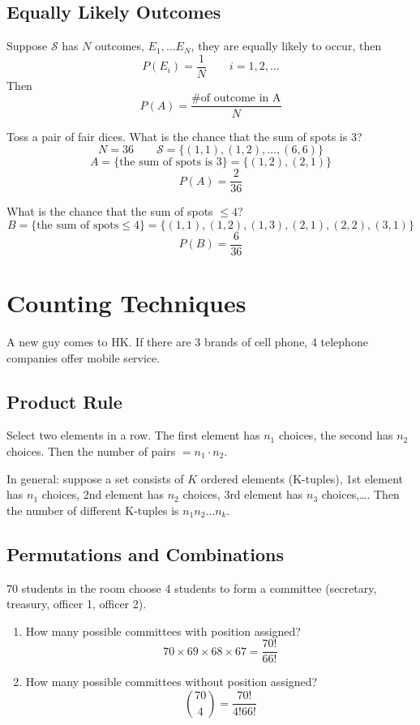 \subsection{Equally Likely Outcomes}
Suppose $\mathcal{S}$ has $N$ outcomes, $E_1,\dots E_N$, they are equally likely to occur, then
\[P(E_i)=\frac{1}{N} \qquad i=1,2,\dots\]
Then \[P(A)=\frac{\text{\# of outcome in A}}{N}\]

\begin{exmp}
Toss a pair of fair dices. What is the chance that the sum of spots is 3?
\[N=36 \qquad \mathcal{S}=\{(1,1),(1,2),\dots ,(6,6)\}\]
\[A=\{\text{the sum of spots is 3}\}=\{(1,2),(2,1)\}\]
\[P(A)=\frac{2}{36}\]
\end{exmp}

\begin{exmp}
What is the chance that the sum of spots $\leq 4$?
\[B=\{\text{the sum of spots}\leq 4\}=\{(1,1),(1,2),(1,3),(2,1),(2,2),(3,1)\}\]
\[P(B)=\frac{6}{36}\]
\end{exmp}

\section{Counting Techniques}
\begin{exmp}
A new guy comes to HK. If there are 3 brands of cell phone, 4 telephone companies offer mobile service.

\end{exmp}

\subsection{Product Rule}
Select two elements in a row. The first element has $n_1$ choices, the second has $n_2$ choices. Then the number of pairs $ = n_1 \cdot n_2$.

In general: suppose a set consists of $K$ ordered elements (K-tuples), 1st element has $n_1$ choices, 2nd element has $n_2$ choices, 3rd element has $n_3$ choices,\dots. Then the number of different K-tuples is $n_1 n_2 \dots n_k$.


\subsection{Permutations and Combinations}
\begin{exmp}
70 students in the room choose 4 students to form a committee (secretary, treasury, officer 1, officer 2).
\begin{enumerate}
\item How many possible committees with position assigned?
\[70 \times 69 \times 68 \times 67=\frac{70!}{66!} \]
\item How many possible committees without position assigned?
\[{70 \choose 4} =\frac{70!}{4!66!}\]
\end{enumerate}
\end{exmp}

